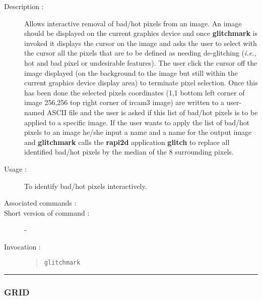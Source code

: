 \begin{description}

\item[Description :] Allows interactive removal of bad/hot
pixels from an image.  An image should be displayed on the current
graphics device and once {\bf glitchmark} is invoked it displays the cursor
on the image and asks the user to select with the cursor all the pixels
that are to be defined as needing de-glitching (\emph{i.e.}, hot and
bad pixel or undesirable features).  The user click the cursor off the
image displayed (on the background to the image but still within the
current graphics device display area) to terminate pixel selection.
Once this has been done the selected pixels coordinates (1,1 bottom
left corner of image 256,256 top right corner of {\sc ircam3} image)
are written to a user-named ASCII file and the user is asked if this
list of bad/hot pixels is to be applied to a specific image.  If the
user wants to apply the list of bad/hot pixels to an image he/she input
a name and a name for the output image and {\bf glitchmark} calls the {\bf
rapi2d} application {\bf glitch} to replace all identified bad/hot pixels by
the median of the 8 surrounding pixels.

\item[Usage :] To identify bad/hot pixels interactively.
\item[Associated commands :] {\tt {}}
\item[Short version of command :] -
\item[Invocation :]

\begin{quote}{\tt  glitchmark }\end{quote}

\end{description}

\hrule
\subsubsection*{\label{GRID}GRID}

